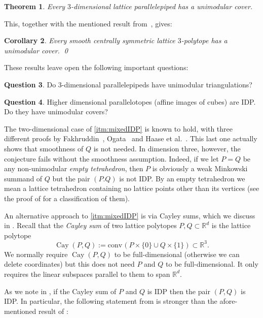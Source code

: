\documentclass{amsart}
\theoremstyle{plain}
\newtheorem{theorem}{Theorem}[section]
\newtheorem{corollary}[theorem]{Corollary}
\theoremstyle{definition}
\newtheorem{question}[theorem]{Question}
\newcommand{\R}{ \ensuremath{\mathbb{R}}}
\newcommand{\conv}{\ensuremath{\mathrm{conv}}\hspace{1pt}}
\newcommand{\cayley}{\operatorname{Cay}}
\begin{document}
\begin{theorem}
\label{thm:parallelepipeds}
Every $3$-dimensional lattice parallelepiped has a unimodular cover.
\end{theorem}

This, together with the mentioned result from~\cite{BHHHJKM2019}, gives:

\begin{corollary}
\label{coro:3cs}
Every smooth centrally symmetric lattice $3$-polytope has a unimodular cover. 
\qed
\end{corollary}

These results leave open the following important questions:

\begin{question}
Do $3$-dimensional parallelepipeds have unimodular triangulations?
\end{question}

\begin{question}
Higher dimensional parallelotopes (affine images of cubes) are IDP. Do they have unimodular covers? 
\end{question}


The two-dimensional case of \eqref{itm:mixedIDP} is known to hold, with three different proofs by Fakhruddin~\cite{Fakhruddin}, Ogata~\cite{Ogata} and Haase et al.~\cite{HNPS2008}. This last one actually shows that smoothness of $Q$ is not needed. In dimension three, however, the conjecture fails without the smoothness assumption. Indeed, if we let $P=Q$ be any non-unimodular \emph{empty tetrahedron}, then $P$ is obviously a weak Minkowski summand of $Q$ but the pair $(P.Q)$ is not IDP. By an empty tetrahedron we mean a lattice tetrahedron containing no lattice points other than its vertices (see the proof of  for a classification of them).

An alternative approach to \eqref{itm:mixedIDP} is via Cayley sums, which we discuss in  . 
Recall that the \emph{Cayley sum} of two lattice polytopes $P,Q\subset \R^d$ is the lattice polytope
\[
\cayley(P,Q) := \conv(P\times\{0\} \cup Q \times \{1\}) \subset \R^3.
\]
We normally require $\cayley(P,Q)$ to be full-dimensional (otherwise we can delete coordinates) but this does not need $P$ and $Q$ to be full-dimensional. It only requires the linear subspaces parallel to them to span $\R^d$.

As we note in , if the Cayley sum of $P$ and $Q$ is IDP then the pair $(P,Q)$ is IDP.
In particular, the following statement from  is stronger than the afore-mentioned result of \cite{Fakhruddin,HNPS2008,Ogata}:
\end{document}
